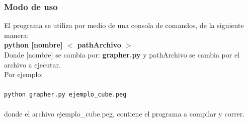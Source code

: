 

\newpage
\subsubsection{Modo de uso}
El programa se utiliza por medio de una consola de comandos, de la siguiente manera:\\
\textbf{ python [nombre] $<$ pathArchivo $>$} \\ 
Donde [nombre] se cambia por: \textbf{grapher.py}
y pathArchivo se cambia por el archivo a ejecutar.
\\
Por ejemplo:\\
\\
\texttt{python grapher.py ejemplo\_cube.peg}
\\
\\
donde el archivo ejemplo\_cube.peg, contiene el programa a compilar y correr.
